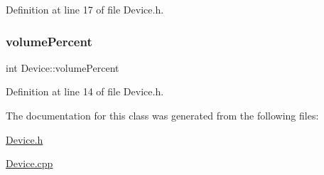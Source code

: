 Definition at line 17 of file Device.\+h.

\mbox{\label{class_device_a4b984b16ab0c4ca441b531aee1c55ed4}} 
\subsubsection{\texorpdfstring{volume\+Percent}{volumePercent}}
{\footnotesize\ttfamily int Device\+::volume\+Percent\hspace{0.3cm}{\ttfamily [private]}}



Definition at line 14 of file Device.\+h.



The documentation for this class was generated from the following files\+:\begin{DoxyCompactItemize}
\item 
\mbox{\hyperlink{_device_8h}{Device.\+h}}\item 
\mbox{\hyperlink{_device_8cpp}{Device.\+cpp}}\end{DoxyCompactItemize}
